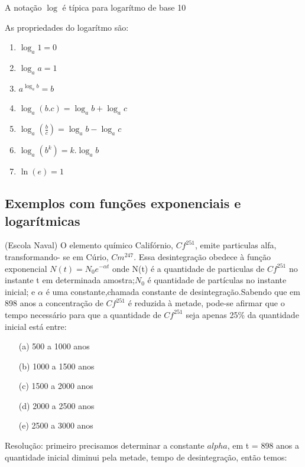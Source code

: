 \begin{multicols*}{2}
    A notação $\log$ é típica para logarítmo de base 10

    As propriedades do logarítmo são:

    \begin{enumerate}
        \item $\log_a 1 = 0$
        \item $\log_a a = 1$
        \item $a^{\log_a b} = b$
        \item $\log_a (b.c) = \log_a b + \log_a c$
        \item $\log_a \left( \frac{b}{c} \right) = \log_a b - \log_a c$
        \item $\log_a (b^k) = k.\log_a b$
        \item $\ln(e) = 1$

    \end{enumerate}


    \subsection*{Exemplos com funções exponenciais e logarítmicas}

    (Escola Naval) O elemento químico Califórnio, $Cf^{251}$, emite particulas alfa, transformando-			se em Cúrio, $Cm^{247}$. Essa desintegração obedece à função exponencial $N(t) = N_0 e^{ - 				\alpha t}$ onde N(t) é a quantidade de particulas de $Cf^{251}$ no instante t em determinada 			amostra;$N_0$ é quantidade de partículas no instante inicial; e $\alpha$ é uma 							constante,chamada constante  de desintegração.Sabendo que em 898 anos a concentração de 				$Cf^{251}$ é reduzida à metade, pode-se afirmar que o tempo necessário para que a
    quantidade de $Cf^{251}$ seja apenas 25\% da quantidade inicial está entre:

    \begin{itemize}
        \item[(a)] 500 a 1000 anos
        \item[(b)] 1000 a 1500 anos
        \item[(c)] 1500 a 2000 anos
        \item[(d)] 2000 a 2500 anos
        \item[(e)] 2500 a 3000 anos
    \end{itemize}

    Resolução: primeiro precisamos determinar a constante $alpha$, em t = 898 anos a quantidade 			inicial diminui pela metade, tempo de desintegração, então temos:


\end{multicols*}
